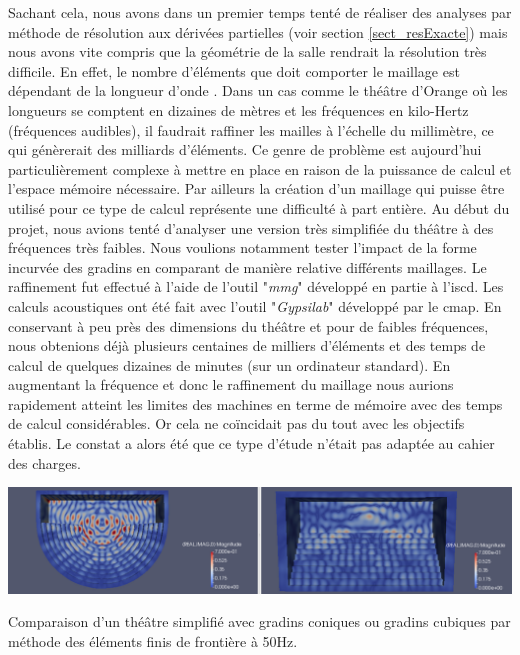 Sachant cela, nous avons dans un premier temps tenté de réaliser des analyses par méthode de résolution aux dérivées partielles (voir section \ref{sect_resExacte}) mais nous avons vite compris que la géométrie de la salle rendrait la résolution très difficile. En effet, le nombre d'éléments que doit comporter le maillage est dépendant de la longueur d'onde \cite[p. 740]{beamtracing}. Dans un cas comme le théâtre d'Orange où les longueurs se comptent en dizaines de mètres et les fréquences en kilo-Hertz (fréquences audibles), il faudrait raffiner les mailles à l'échelle du millimètre, ce qui génèrerait des milliards d'éléments. Ce genre de problème est aujourd'hui particulièrement complexe à mettre en place en raison de la puissance de calcul et l'espace mémoire nécessaire. Par ailleurs la création d'un maillage qui puisse être utilisé pour ce type de calcul représente une difficulté à part entière. Au début du projet, nous avions tenté d'analyser une version très simplifiée du théâtre à des fréquences très faibles. Nous voulions notamment tester l'impact de la forme incurvée des gradins en comparant de manière relative différents maillages. Le raffinement fut effectué à l'aide de l'outil "\textit{mmg}" \cite[github]{mmg} développé en partie à l'\gls{iscd}. Les calculs acoustiques ont été fait avec l'outil "\textit{Gypsilab}" \cite[github]{gypsilab} développé par le \gls{cmap}. En conservant à peu près des dimensions du théâtre et pour de faibles fréquences, nous obtenions déjà plusieurs centaines de milliers d'éléments et des temps de calcul de quelques dizaines de minutes (sur un ordinateur standard). En augmentant la fréquence et donc le raffinement du maillage nous aurions rapidement atteint les limites des machines en terme de mémoire avec des temps de calcul considérables. Or cela ne coïncidait pas du tout avec les objectifs établis. Le constat a alors été que ce type d'étude n'était pas adaptée au cahier des charges.

\begin{figureth}
	\includegraphics[width=\linewidth]{images/BEM}
	\caption{Comparaison d'un théâtre simplifié avec gradins coniques ou gradins cubiques par méthode des éléments finis de frontière à 50Hz.}
	\label{BEM}
\end{figureth}

